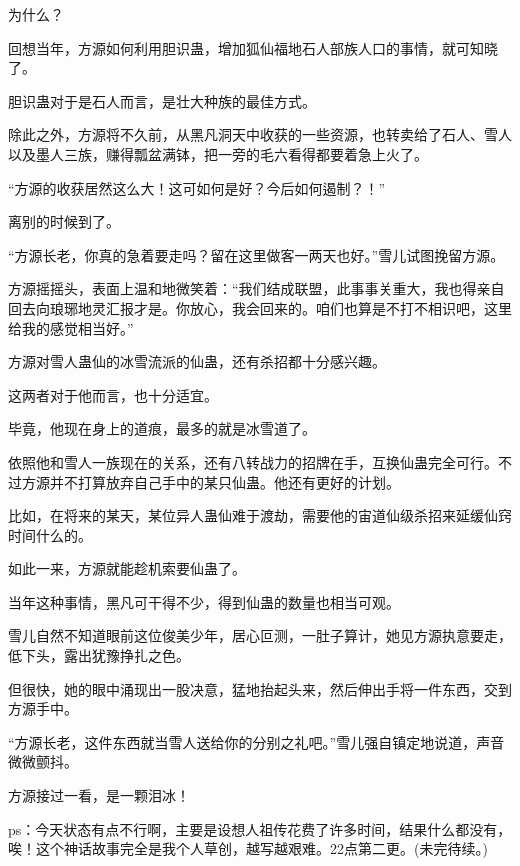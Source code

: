 \begin{this_body}
为什么？

回想当年，方源如何利用胆识蛊，增加狐仙福地石人部族人口的事情，就可知晓了。

胆识蛊对于是石人而言，是壮大种族的最佳方式。

除此之外，方源将不久前，从黑凡洞天中收获的一些资源，也转卖给了石人、雪人以及墨人三族，赚得瓢盆满钵，把一旁的毛六看得都要着急上火了。

“方源的收获居然这么大！这可如何是好？今后如何遏制？！”

离别的时候到了。

“方源长老，你真的急着要走吗？留在这里做客一两天也好。”雪儿试图挽留方源。

方源摇摇头，表面上温和地微笑着：“我们结成联盟，此事事关重大，我也得亲自回去向琅琊地灵汇报才是。你放心，我会回来的。咱们也算是不打不相识吧，这里给我的感觉相当好。”

方源对雪人蛊仙的冰雪流派的仙蛊，还有杀招都十分感兴趣。

这两者对于他而言，也十分适宜。

毕竟，他现在身上的道痕，最多的就是冰雪道了。

依照他和雪人一族现在的关系，还有八转战力的招牌在手，互换仙蛊完全可行。不过方源并不打算放弃自己手中的某只仙蛊。他还有更好的计划。

比如，在将来的某天，某位异人蛊仙难于渡劫，需要他的宙道仙级杀招来延缓仙窍时间什么的。

如此一来，方源就能趁机索要仙蛊了。

当年这种事情，黑凡可干得不少，得到仙蛊的数量也相当可观。

雪儿自然不知道眼前这位俊美少年，居心叵测，一肚子算计，她见方源执意要走，低下头，露出犹豫挣扎之色。

但很快，她的眼中涌现出一股决意，猛地抬起头来，然后伸出手将一件东西，交到方源手中。

“方源长老，这件东西就当雪人送给你的分别之礼吧。”雪儿强自镇定地说道，声音微微颤抖。

方源接过一看，是一颗泪冰！

ps：今天状态有点不行啊，主要是设想人祖传花费了许多时间，结果什么都没有，唉！这个神话故事完全是我个人草创，越写越艰难。22点第二更。(未完待续。)

\end{this_body}

